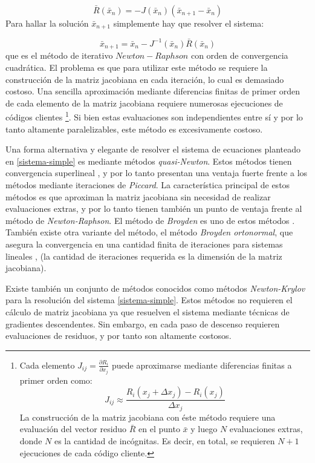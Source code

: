 \begin{equation}
\bar{R}(\bar{x}_n) = -J(\bar{x}_n)(\bar{x}_{n+1}-\bar{x}_n)
\end{equation}
Para hallar la solución $\bar{x}_{n+1}$ simplemente hay que resolver el sistema:

\begin{equation}
\bar{x}_{n+1} = \bar{x}_{n} -J^{-1}(\bar{x}_n)\bar{R}(\bar{x}_n)
\end{equation}
que es el método de iterativo $Newton-Raphson$ con orden de convergencia cuadrática.
El problema es que para utilizar este método se requiere la construcción de la matriz jacobiana en cada iteración, lo cual es demasiado costoso.
Una sencilla aproximación mediante diferencias finitas de primer orden de cada elemento de la matriz jacobiana requiere numerosas ejecuciones de códigos clientes
\footnote{
Cada elemento $J_{ij}=\frac{\partial R_i}{\partial x_j}$ puede aproximarse mediante diferencias finitas a primer orden como:
\begin{equation}
J_{ij} \approx \frac{R_i(x_j + \Delta x_j) - R_i(x_j)}{\Delta x_j}
\end{equation}
La construcción de la matriz jacobiana con éste método requiere una evaluación del vector residuo $\bar{R}$ en el punto $\bar{x}$ y luego $N$ evaluaciones extras, donde $N$ es la cantidad de incógnitas. Es decir, en total, se requieren $N+1$ ejecuciones de cada código cliente.
}.
Si bien estas evaluaciones son independientes entre sí y por lo tanto altamente paralelizables, este método es excesivamente costoso.

Una forma alternativa y elegante de resolver el sistema de ecuaciones planteado en \ref{sistema-simple} es mediante métodos \textit{quasi-Newton}.
Estos métodos tienen convergencia superlineal \cite{broyden-on}, y por lo tanto presentan una ventaja fuerte frente a los métodos mediante iteraciones de \textit{Piccard}. 
La característica principal de estos métodos es que aproximan la matriz jacobiana sin necesidad de realizar evaluaciones extras, y por lo tanto tienen también un punto de ventaja frente al método de \textit{Newton-Raphson}.
El método de \textit{Broyden} es uno de estos métodos \cite{broyden}.
También existe otra variante del método, el método \textit{Broyden ortonormal}, que asegura la convergencia en una cantidad finita de iteraciones para sistemas lineales \cite{broyden-on}, (la cantidad de iteraciones requerida es la dimensión de la matriz jacobiana).

Existe también un conjunto de métodos conocidos como métodos \textit{Newton-Krylov} para la resolución del sistema \ref{sistema-simple}. Estos métodos no requieren el cálculo de matriz jacobiana ya que resuelven el sistema mediante técnicas de gradientes descendentes. Sin embargo, en cada paso de descenso requieren evaluaciones de residuos, y por tanto son altamente costosos.

